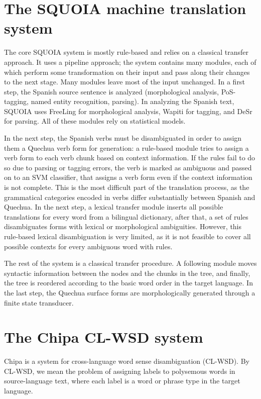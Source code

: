 \documentclass[10pt, a4paper]{article}
\begin{document}
\section{The SQUOIA machine translation system}
The core SQUOIA system is mostly rule-based and relies on a classical transfer
approach.
It uses a pipeline approach; the system contains many modules, each of which
perform some transformation on their input and pass along their changes to the
next stage. Many modules leave most of the input unchanged.
In a first step, the Spanish source sentence
is analyzed (morphological analysis, PoS-tagging, named entity recognition,
parsing). In analyzing the Spanish text, SQUOIA uses FreeLing \cite{padro12}
for morphological analysis, Wapiti \cite{lavergne2010practical} for tagging,
and DeSr \cite{attardi-EtAl:2007:EMNLP-CoNLL2007} for parsing. All of
these modules rely on statistical models.

In the next step, the Spanish verbs must be disambiguated in order to assign
them a Quechua verb form for generation: a rule-based module tries to assign a
verb form to each verb chunk based on context information. If the rules fail to
do so due to parsing or tagging errors, the verb is marked as ambiguous and
passed on to an SVM classifier, that assigns a verb form even if the context
information is not complete. This is the most difficult part of the translation
process, as the grammatical categories encoded in verbs differ substantially
between Spanish and Quechua.  In the next step, a lexical transfer module
inserts all possible translations for every word from a bilingual dictionary,
after that, a set of rules disambiguates forms with lexical or morphological
ambiguities. However, this rule-based lexical disambiguation is very limited,
as it is not feasible to cover all possible contexts for every ambiguous word
with rules.

The rest of the system is a classical transfer procedure. A following module
moves syntactic information between the nodes and the chunks in the tree, and
finally, the tree is reordered according to the basic word order in the target
language. In the last step, the Quechua surface forms are morphologically
generated through a finite state transducer.

\section{The Chipa CL-WSD system}
Chipa is a system for cross-language word sense disambiguation (CL-WSD). By
CL-WSD, we mean the problem of assigning labels to polysemous words in
source-language text, where each label is a word or phrase type in the target
language.
\end{document}
